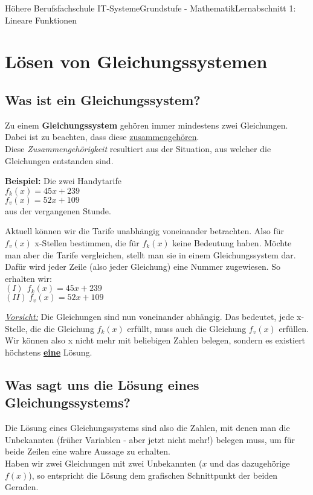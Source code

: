 \documentclass[11pt,twocolumn,oneside,openany,headings=optiontotoc,11pt,numbers=noenddot]{article}
\begin{document}
	\begin{worksheet}{Höhere Berufsfachschule IT-Systeme}{Grundstufe - 
		Mathematik}{Lernabschnitt 1: Lineare Funktionen}
		\section*{Lösen von Gleichungssystemen}
		\label{sec:lgs}
		\setcounter{section}{1}
		\subsection{Was ist ein Gleichungssystem?}
		Zu einem \textbf{Gleichungssystem} gehören immer mindestens zwei Gleichungen. Dabei ist zu beachten, dass diese \underline{zusammengehören}.\\
		Diese \textit{Zusammengehörigkeit} resultiert aus der Situation, aus welcher die Gleichungen entstanden sind.\\
		\par\noindent
		\textbf{Beispiel:} Die zwei Handytarife\\
		\(f_k(x) = 45x + 239\)\\
		\(f_v(x) = 52x + 109\)\\
		aus der vergangenen Stunde.\\
		\par\noindent
		Aktuell können wir die Tarife unabhängig voneinander betrachten. Also für \(f_v(x)\) x-Stellen bestimmen, die für \(f_k(x)\) keine Bedeutung haben. Möchte man aber die Tarife vergleichen, stellt man sie in einem Gleichungssystem dar. Dafür wird jeder Zeile (also jeder Gleichung) eine Nummer zugewiesen. So erhalten wir:\\
		\((I)\ \ f_k(x) = 45x + 239\)\\
		\((II)\ f_v(x) = 52x + 109\)\\
		\par\noindent
		\underline{\textit{Vorsicht:}} Die Gleichungen sind nun voneinander abhängig. Das bedeutet, jede x-Stelle, die die Gleichung \(f_k(x)\) erfüllt, muss auch die Gleichung \(f_v(x)\) erfüllen.\\
		Wir können also x nicht mehr mit beliebigen Zahlen belegen, sondern es existiert höchstens \underline{\textbf{eine}} Lösung.
		\subsection{Was sagt uns die Lösung eines Gleichungssystems?}
		Die Lösung eines Gleichungssystems sind also die Zahlen, mit denen man die Unbekannten (früher Variablen - aber jetzt nicht mehr!) belegen muss, um für beide Zeilen eine wahre Aussage zu erhalten.\\
		Haben wir zwei Gleichungen mit zwei Unbekannten (\(x\) und das dazugehörige \(f(x)\)), so entspricht die Lösung dem grafischen Schnittpunkt der beiden Geraden.\\

\end{worksheet}
\end{document}
